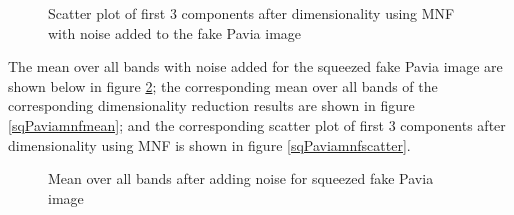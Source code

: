 \documentclass[conference,onecolumn]{IEEEtran}
\begin{document}
\begin{figure}[H]
	\centering
	\caption{Scatter plot of first 3 components after dimensionality using MNF with noise added to the fake Pavia image}
	\label{Paviamnfscatter}
\end{figure}

The  mean over all bands with noise added for the squeezed fake Pavia image are shown below in figure \ref{sqPaviamean}; the corresponding mean over all bands of the corresponding dimensionality reduction results are shown in figure \ref{sqPaviamnfmean}; and the corresponding scatter plot of first 3 components after dimensionality using MNF is shown in figure \ref{sqPaviamnfscatter}.
\begin{figure}[H]
	\centering
	\caption{Mean over all bands after adding noise for squeezed fake Pavia image}
	\label{sqPaviamean}
\end{figure}
\end{document}
